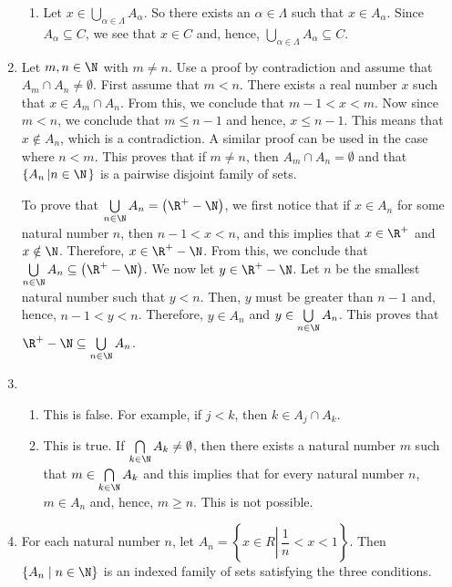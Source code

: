 \begin{enumerate}
\begin{enumerate}
\item Let $x \in \bigcup\limits_{\alpha \in \Lambda}^{}A_\alpha$.  So there exists an 
$\alpha \in \Lambda$ such that $x \in A_{\alpha}$.  Since $A_{\alpha} \subseteq C$, we see that 
$x \in C$ and, hence, $\bigcup\limits_{\alpha \in \Lambda}^{}A_\alpha \subseteq C$.
\end{enumerate}



\item Let $m, n \in \N$ with $m \ne n$.  Use a proof by contradiction and assume that 
$A_m \cap A_n \ne \emptyset$.  First assume that $m < n$.  There exists a real number $x$ such that $x \in A_m \cap A_n$.  From this, we conclude that $m - 1 < x < m$.  Now since $m < n$, we conclude that $m \leq n-1$ and hence, $x \leq n - 1$.  This means that $x \notin A_n$, which is a contradiction.  A similar proof can be used in the case where $n < m$.  This proves that 
if $m \ne n$, then $A_m \cap A_n = \emptyset$ and that $\left\{ A_n \left| n \in \N \right. \right\}$ is a pairwise disjoint family of sets.

To prove that $\bigcup\limits_{n \in \N}^{}A_n = \left( \R^+ - \N \right)$, we first notice that if $x \in A_n$ for some natural number $n$, then $n -1 < x < n$, and this implies that 
$x \in \R^+$ and $x \notin \N$.  Therefore, $x \in \R^+ - \N$.  From this, we conclude that 
$\bigcup\limits_{n \in \N}^{}A_n \subseteq \left( \R^+ - \N \right)$.  We now let 
$y \in \R^+ - \N$.  Let $n$ be the smallest natural number such that $y < n$.  Then, $y$ must be greater than $n - 1$ and, hence, $n - 1 < y < n$.  Therefore, $y \in A_n$ and 
$y \in \bigcup\limits_{n \in \N}^{}A_n$.  This proves that 
$\R^+ - \N \subseteq \bigcup\limits_{n \in \N}^{}A_n$.



\item \begin{enumerate}
\item This is false.  For example, if $j < k$, then $k \in A_j \cap A_k$.

\item This is true. If $\bigcap\limits_{k \in \N}^{}A_k \ne \emptyset$, then there exists a natural number $m$ such that $m \in \bigcap\limits_{k \in \N}^{}A_k$ and this implies that for every natural number $n$, $m \in A_n$ and, hence, $m \geq n$.  This is not possible.
\end{enumerate}



\item For each natural number $n$, let 
$A_n = \left\{ x \in R \left| \,\dfrac{1}{n} < x < 1 \right. \right\}$.  Then 
$\left\{ A_n \mid n \in \N \right\}$ is an indexed family of sets satisfying the three conditions.




\end{enumerate}

